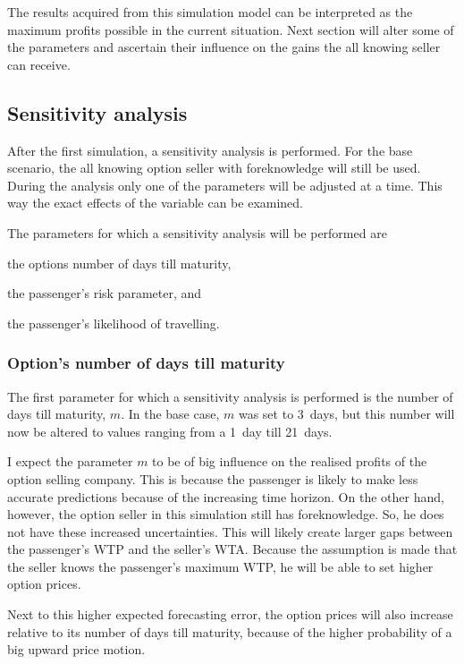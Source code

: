 The results acquired from this simulation model can be interpreted as the maximum profits possible in the current situation. Next section will alter some of the parameters and ascertain their influence on the gains the all knowing seller can receive.


\subsection{Sensitivity analysis}
After the first simulation, a sensitivity analysis is performed. For the base scenario, the all knowing option seller with foreknowledge will still be used. During the analysis only one of the parameters will be adjusted at a time. This way the exact effects of the variable can be examined.

The parameters for which a sensitivity analysis will be performed are \begin{inparaenum}
    \item the options number of days till maturity,
    \item the passenger's risk parameter, and
    \item the passenger's likelihood of travelling.
\end{inparaenum}

\subsubsection{Option's number of days till maturity}
The first parameter for which a sensitivity analysis is performed is the number of days till maturity, $m$. In the base case, $m$ was set to 3~days, but this number will now be altered to values ranging from a 1~day till 21~days.

I expect the parameter $m$ to be of big influence on the realised profits of the option selling company. This is because the passenger is likely to make less accurate predictions because of the increasing time horizon. On the other hand, however, the option seller in this simulation still has foreknowledge. So, he does not have these increased uncertainties. This will likely create larger gaps between the passenger's WTP and the seller's WTA. Because the assumption is made that the seller knows the passenger's maximum WTP, he will be able to set higher option prices.

Next to this higher expected forecasting error, the option prices will also increase relative to its number of days till maturity, because of the higher probability of a big upward price motion.

